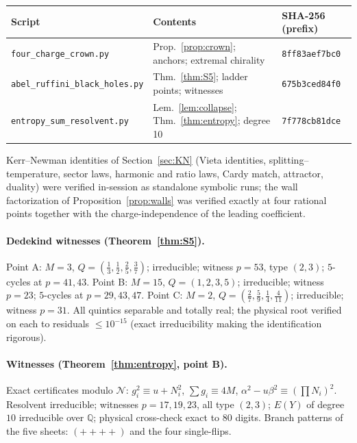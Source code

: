 \documentclass[11pt]{article}
\theoremstyle{definition}
\theoremstyle{remark}
\newcommand{\Q}{\mathbb{Q}}
\begin{document}
\begin{center}
\begin{tabular}{@{}lll@{}}
\toprule
Script & Contents & SHA-256 (prefix)\\
\midrule
\texttt{four\_charge\_crown.py} &
Prop.~\ref{prop:crown}; anchors; extremal chirality &
\texttt{8ff83aef7bc0}\\
\texttt{abel\_ruffini\_black\_holes.py} &
Thm.~\ref{thm:S5}; ladder points; witnesses &
\texttt{675b3ced84f0}\\
\texttt{entropy\_sum\_resolvent.py} &
Lem.~\ref{lem:collapse}; Thm.~\ref{thm:entropy}; degree 10 &
\texttt{7f778cb81dce}\\
\bottomrule
\end{tabular}
\end{center}

\noindent Kerr--Newman identities of Section~\ref{sec:KN} (Vieta identities,
splitting--temperature, sector laws, harmonic and ratio laws, Cardy match,
attractor, duality) were verified in-session as standalone symbolic runs; the
wall factorization of Proposition~\ref{prop:walls} was verified exactly at
four rational points together with the charge-independence of the leading
coefficient.

\paragraph{Dedekind witnesses (Theorem~\ref{thm:S5}).}
Point A: $M=3$, $Q=(\frac13,\frac12,\frac25,\frac37)$; irreducible; witness
$p=53$, type $(2,3)$; $5$-cycles at $p=41,43$. Point B: $M=15$, $Q=(1,2,3,5)$;
irreducible; witness $p=23$; $5$-cycles at $p=29,43,47$. Point C: $M=2$,
$Q=(\frac27,\frac59,\frac14,\frac4{11})$; irreducible; witness $p=31$.
All quintics separable and totally real; the physical root verified on each to
residuals $\le10^{-15}$ (exact irreducibility making the identification
rigorous).

\paragraph{Witnesses (Theorem~\ref{thm:entropy}, point B).}
Exact certificates modulo $\mathcal N$: $g_i^2\equiv u+N_i^2$,
$\sum g_i\equiv 4M$, $\alpha^2-u\beta^2\equiv(\prod N_i)^2$. Resolvent
irreducible; witnesses $p=17,19,23$, all type $(2,3)$; $E(Y)$ of degree $10$
irreducible over $\Q$; physical cross-check exact to $80$ digits. Branch
patterns of the five sheets: $(++++)$ and the four single-flips.
\end{document}
